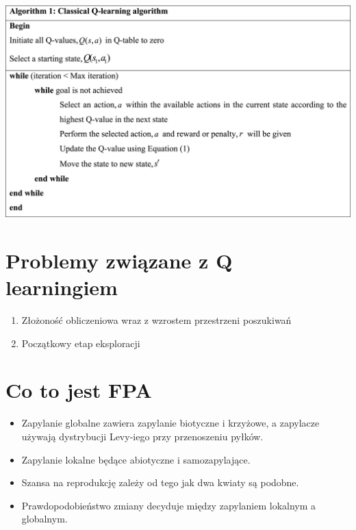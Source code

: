 \documentclass[aspectratio=169,15pt,]{beamer}
\begin{document}
\begin{frame}
\includegraphics[width =\textwidth]{Obrazy/Pseudo.jpg}
\end{frame}
\section{Problemy związane z Q learningiem}
\begin{frame}
	\sectionpage

\end{frame}
\begin{frame}
\centering
\Huge
\begin{enumerate}
  \item<1->
        Złożoność obliczeniowa wraz z wzrostem przestrzeni poszukiwań
        \vspace{10pt}

  \item<2->
      Początkowy etap eksploracji

 \end{enumerate}
\end{frame}
\section{Co to jest FPA}
\begin{frame}
	\sectionpage

\end{frame}

\begin{frame}
\begin{itemize}
 \item<1-> Zapylanie globalne zawiera zapylanie biotyczne i krzyżowe, a zapylacze używają dystrybucji Levy-iego przy przenoszeniu pyłków.
 \item<2-> Zapylanie lokalne będące abiotyczne i samozapylające.
 \item<3-> Szansa na reprodukcję zależy od tego jak dwa kwiaty są podobne.
 \item<4-> Prawdopodobieństwo zmiany decyduje między zapylaniem lokalnym a globalnym.
\end{itemize}
\end{frame}
\end{document}
